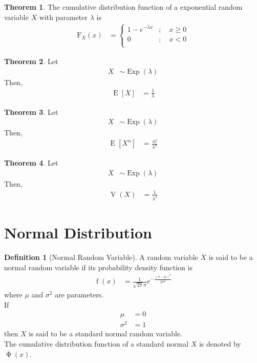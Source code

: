 \documentclass[titlepage, fleqn, a4paper, 12pt, twoside]{article}
\theoremstyle{definition}
\newtheorem{definition}{Definition}
\theoremstyle{theorem}
\newtheorem{theorem}{Theorem}
\DeclareMathOperator{\expct}{\mathrm{E}}
\DeclareMathOperator{\var}{\mathrm{V}}
\DeclareMathOperator{\pdf}{\mathrm{f}}
\DeclareMathOperator{\stdnormalcdf}{\mathrm{\Phi}}
\DeclareMathOperator{\exponential}{\mathrm{Exp}}
\newcommand*{\cdf}[1]{\mathrm{F}_{#1}}
\begin{document}
\begin{theorem}
	The cumulative distribution function of a exponential random variable $X$ with parameter $\lambda$ is
	\begin{align*}
		\cdf{X}(x) &=
			\begin{cases}
				1 - e^{-\lambda x} &;\quad x \ge 0\\
				0 &;\quad x < 0\\
			\end{cases}
	\end{align*}
\end{theorem}

\begin{theorem}
	Let
	\begin{align*}
		X &\sim \exponential(\lambda)
	\end{align*}
	Then,
	\begin{align*}
		\expct[X] &= \frac{1}{\lambda}
	\end{align*}
\end{theorem}

\begin{theorem}
	Let
	\begin{align*}
		X &\sim \exponential(\lambda)
	\end{align*}
	Then,
	\begin{align*}
		\expct\left[ X^n \right] &= \frac{n!}{\lambda^n}
	\end{align*}
\end{theorem}

\begin{theorem}
	Let
	\begin{align*}
		X &\sim \exponential(\lambda)
	\end{align*}
	Then,
	\begin{align*}
		\var(X) &= \frac{1}{\lambda^2}
	\end{align*}
\end{theorem}

\section{Normal Distribution}

\begin{definition}[Normal Random Variable]
	A random variable $X$ is said to be a normal random variable if its probability density function is
	\begin{align*}
		\pdf(x) &= \frac{1}{\sqrt{2 \pi} \sigma} e^{-\frac{(x - \mu)^2}{2 \sigma^2}}
	\end{align*}
	where $\mu$ and $\sigma^2$ are parameters.\\
	If
	\begin{align*}
		\mu &= 0\\
		\sigma^2 &= 1
	\end{align*}
	then $X$ is said to be a standard normal random variable.\\
	The cumulative distribution function of a standard normal $X$ is denoted by $\stdnormalcdf(x)$.
\end{definition}
\end{document}
